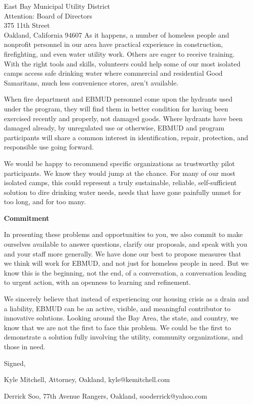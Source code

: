 \documentclass[letterpaper]{letter}
\begin{document}
\begin{letter}{%
    East Bay Municipal Utility District\\
    Attention: Board of Directors\\
    375 11th Street\\
    Oakland, California 94607}
    As it happens, a number of homeless people and nonprofit personnel in our area have practical experience in construction, firefighting, and even water utility work. Others are eager to receive training. With the right tools and skills, volunteers could help some of our most isolated camps access safe drinking water where commercial and residential Good Samaritans, much less convenience stores, aren’t available.

    When fire department and EBMUD personnel come upon the hydrants used under the program, they will find them in better condition for having been exercised recently and properly, not damaged goods. Where hydrants have been damaged already, by unregulated use or otherwise, EBMUD and program participants will share a common interest in identification, repair, protection, and responsible use going forward.

    We would be happy to recommend specific organizations as trustworthy pilot participants. We know they would jump at the chance. For many of our most isolated camps, this could represent a truly sustainable, reliable, self-sufficient solution to dire drinking water needs, needs that have gone painfully unmet for too long, and for too many.

    \stopbreaks
    \textbf{Commitment}

    In presenting these problems and opportunities to you, we also commit to make ourselves available to answer questions, clarify our proposals, and speak with you and your staff more generally. We have done our best to propose measures that we think will work for EBMUD, and not just for homeless people in need. But we know this is the beginning, not the end, of a conversation, a conversation leading to urgent action, with an openness to learning and refinement.
    \startbreaks

    We sincerely believe that instead of experiencing our housing crisis as a drain and a liability, EBMUD can be an active, visible, and meaningful contributor to innovative solutions. Looking around the Bay Area, the state, and country, we know that we are not the first to face this problem. We could be the first to demonstrate a solution fully involving the utility, community organizations, and those in need.

    \begin{samepage}
    Signed,

    Kyle Mitchell, Attorney, Oakland, kyle@kemitchell.com

    Derrick Soo, 77th Avenue Rangers, Oakland, sooderrick@yahoo.com


\end{samepage}
\end{letter}
\end{document}
